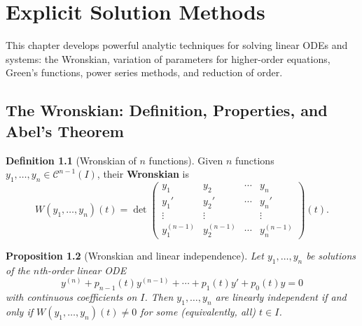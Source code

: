 \documentclass[12pt,a4paper,openany]{book}
\theoremstyle{definition}
\newtheorem{definition}{Definition}[chapter]
\theoremstyle{plain}
\newtheorem{proposition}[definition]{Proposition}
\theoremstyle{remark}
\begin{document}
\chapter{Explicit Solution Methods}\label{ch:explicit-methods}

This chapter develops powerful analytic techniques for solving linear
ODEs and systems: the Wronskian, variation of parameters for higher-order
equations, Green's functions, power series methods, and reduction of order.

\section{The Wronskian: Definition, Properties, and Abel's Theorem}
\label{sec:wronskian}

\begin{definition}[Wronskian of $n$ functions]\label{def:wronskian}
Given $n$ functions $y_1,\dots,y_n\in\mathcal{C}^{n-1}(I)$, their
\textbf{Wronskian} is
\begin{equation}\label{eq:wronskian-def}
  W(y_1,\dots,y_n)(t) = \det\begin{pmatrix}
    y_1 & y_2 & \cdots & y_n \\
    y_1' & y_2' & \cdots & y_n' \\
    \vdots & \vdots & & \vdots \\
    y_1^{(n-1)} & y_2^{(n-1)} & \cdots & y_n^{(n-1)}
  \end{pmatrix}(t).
\end{equation}
\end{definition}

\begin{proposition}[Wronskian and linear independence]\label{prop:wronskian-indep}
Let $y_1,\dots,y_n$ be solutions of the $n$th-order linear ODE
\begin{equation}\label{eq:nth-order-hom}
  y^{(n)} + p_{n-1}(t)y^{(n-1)} + \cdots + p_1(t)y' + p_0(t)y = 0
\end{equation}
with continuous coefficients on $I$.  Then $y_1,\dots,y_n$ are linearly
independent if and only if $W(y_1,\dots,y_n)(t)\neq 0$ for some
(equivalently, all) $t\in I$.
\end{proposition}
\end{document}
